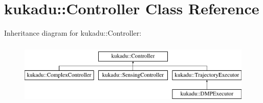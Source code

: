 \hypertarget{classkukadu_1_1Controller}{\section{kukadu\-:\-:Controller Class Reference}
\label{classkukadu_1_1Controller}
}
Inheritance diagram for kukadu\-:\-:Controller\-:\begin{figure}[H]
\begin{center}
\leavevmode
\includegraphics[height=3.000000cm]{classkukadu_1_1Controller}
\end{center}
\end{figure}
